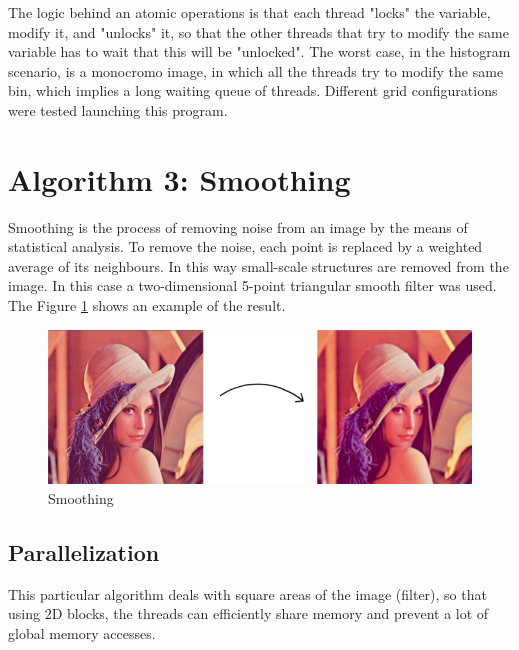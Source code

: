 \documentclass[a4paper]{article}
\begin{document}
The logic behind an atomic operations is that each thread "locks" the variable, modify it, and "unlocks" it, so that the other threads that try to modify the same variable has to wait that this will be "unlocked". The worst case, in the histogram scenario, is a monocromo image, in which all the threads try to modify the same bin, which implies a long waiting queue of threads.
 Different grid configurations were tested launching this program. 


\section{Algorithm 3: Smoothing}
\label{sec:smoo}
Smoothing is the process of removing noise from an image by the means of statistical analysis. To remove the noise, each point is replaced by a weighted average of its neighbours. In this way small-scale structures are removed from the image. In this case a two-dimensional 5-point triangular smooth filter was used. The Figure \ref{fig:smooth} shows an example of the result.

\begin{figure}[ht]
    \centering
    \includegraphics[width=0.5\linewidth]{smooth}
    \caption{Smoothing}
    \label{fig:smooth}
\end{figure}
\FloatBarrier

\subsection{Parallelization}
\label{sec:p2}
This particular algorithm deals with square areas of the image (filter), so that using 2D blocks, the threads can efficiently share memory and prevent a lot of global memory accesses.
\end{document}
